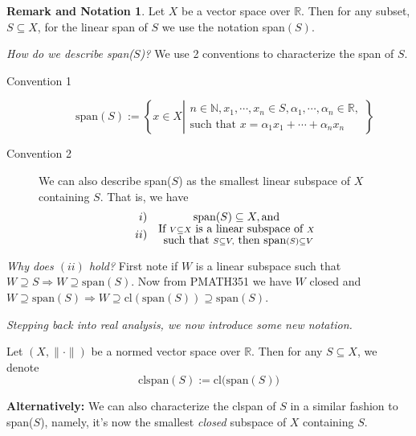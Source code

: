 \documentclass[11pt]{amsart}
\theoremstyle{definition}
\newtheorem{remark-and-notation}[theorem]{Remark and Notation}
\numberwithin{equation}{section}
\newcommand{\bN}{ \mathbb{N} }	%
\newcommand{\bR}{ \mathbb{R} }	%
\newcommand{\nvs}{\left(X, \| \cdot \| \right)}					%
\newcommand{ \sspan }{ \mbox{span} }						%
\newcommand{ \clspan }{ \mbox{clspan} }						%
\begin{document}
\begin{remark-and-notation}\label{remnot:41} Let $X$ be a vector space over $\bR$. Then for any subset, $S \subseteq X$, for the linear span of $S$ we use the notation span$(S)$. 

\vspace{4pt}

\textit{How do we describe span($S$)?} We use 2 conventions to characterize the span of $S$. 
\begin{description}
\item[Convention 1] 
\[ \sspan (S) := \left\{ x \in X 
	\left|
	\begin{array}{c}
	n \in \bN, x_1, \cdots, x_n \in S, \alpha_1, \cdots, \alpha_n \in \bR, \\
	\mbox{such that } x = \alpha_1 x_1 + \cdots  + \alpha_n x_n 
	\end{array}
	\right.
\right\}
\]
\vspace{2pt}
\item[Convention 2] We can also describe span($S$) as the smallest linear subspace of $X$ containing $S$. That is, we have 
\[ \begin{array}{rc}
i) & \sspan(S) \subseteq X, \mbox{and}\\
ii) & \begin{subarray}{c}
\mbox{If } V \subseteq X \mbox{ is a linear subspace of } X \\
\mbox{ such that } S \subseteq V, \mbox{ then } \sspan(S) \subseteq V
\end{subarray}
\end{array}\]
\end{description}

\vspace{4pt}

\noindent \textit{Why does $(ii)$ hold?} First note if $W$ is a linear subspace such that $W \supseteq S \Rightarrow W \supseteq \sspan(S)$. 
Now from PMATH351 we have $W$ closed and $W \supseteq \sspan(S) \Rightarrow W \supseteq \mbox{cl}(\sspan(S)) \supseteq \sspan(S)$.

\vspace{10pt}

 \textit{Stepping back into real analysis, we now introduce some new notation.}

\vspace{4pt}

\noindent Let $\nvs$ be a normed vector space over $\bR$. Then for any $S \subseteq X$, we denote
\[ \clspan(S) := \mbox{cl(span}(S)) \]

\vspace{6pt}

\noindent \textbf{Alternatively:} We can also characterize the clspan of $S$ in a similar fashion to span($S$), namely, it's now the smallest \textit{closed} subspace of $X$ containing $S$. 
\end{remark-and-notation}
\end{document}
